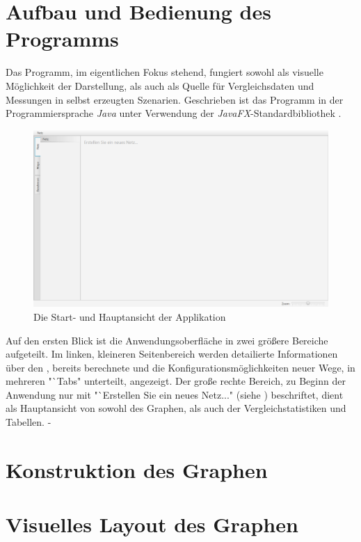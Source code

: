 \documentclass[12pt]{article}
\begin{document}
\section{Aufbau und Bedienung des Programms}
Das Programm, im eigentlichen Fokus stehend, fungiert sowohl als visuelle Möglichkeit der Darstellung, als auch als Quelle für Vergleichsdaten und Messungen in selbst erzeugten Szenarien.
Geschrieben ist das Programm in der Programmiersprache \textit{Java} unter Verwendung der \textit{JavaFX}-Standardbibliothek \cite{javafx}.
\begin{figure}[h!]
\includegraphics[width=\textwidth]{res/main_screenshot.png}
\centering
\caption{Die Start- und Hauptansicht der Applikation\label{fig:main_screenshot}}
\end{figure}
Auf den ersten Blick ist die Anwendungsoberfläche in zwei größere Bereiche aufgeteilt. Im linken, kleineren Seitenbereich werden detailierte Informationen über den , bereits berechnete  und die Konfigurationsmöglichkeiten neuer Wege, in mehreren "`Tabs" unterteilt, angezeigt. Der große rechte Bereich, zu Beginn der Anwendung nur mit "`Erstellen Sie ein neues Netz..." (siehe \cite{fig:main_screenshot}) beschriftet, dient als Hauptansicht von sowohl des Graphen, als auch der Vergleichstatistiken und Tabellen.
\newpage
-
\newpage

\section{Konstruktion des Graphen}

\newpage

\section{Visuelles Layout des Graphen}
\label{sec:layout}
\newpage
\end{document}

